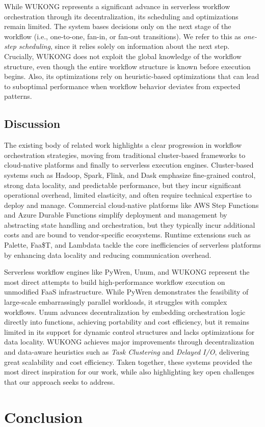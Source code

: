 \documentclass[conference]{IEEEtran}
\begin{document}
While WUKONG represents a significant advance in serverless workflow orchestration through its decentralization, its scheduling and optimizations remain limited. The system bases decisions only on the next stage of the workflow (i.e., one-to-one, fan-in, or fan-out transitions). We refer to this as \textit{one-step scheduling}, since it relies solely on information about the next step. Crucially, WUKONG does not exploit the global knowledge of the workflow structure, even though the entire workflow structure is known before execution begins. Also, its optimizations rely on heuristic-based optimizations that can lead to suboptimal performance when workflow behavior deviates from expected patterns.

\subsection{Discussion}
The existing body of related work highlights a clear progression in workflow orchestration strategies, moving from traditional cluster-based frameworks to cloud-native platforms and finally to serverless execution engines. Cluster-based systems such as Hadoop, Spark, Flink, and Dask emphasize fine-grained control, strong data locality, and predictable performance, but they incur significant operational overhead, limited elasticity, and often require technical expertise to deploy and manage. Commercial cloud-native platforms like AWS Step Functions and Azure Durable Functions simplify deployment and management by abstracting state handling and orchestration, but they typically incur additional costs and are bound to vendor-specific ecosystems. Runtime extensions such as Palette, Faa\$T, and Lambdata tackle the core inefficiencies of serverless platforms by enhancing data locality and reducing communication overhead.

Serverless workflow engines like PyWren, Unum, and WUKONG represent the most direct attempts to build high-performance workflow execution on unmodified FaaS infrastructure. While PyWren demonstrates the feasibility of large-scale embarrassingly parallel workloads, it struggles with complex workflows. Unum advances decentralization by embedding orchestration logic directly into functions, achieving portability and cost efficiency, but it remains limited in its support for dynamic control structures and lacks optimizations for data locality. WUKONG achieves major improvements through decentralization and data-aware heuristics such as \textit{Task Clustering} and \textit{Delayed I/O}, delivering great scalability and cost efficiency. Taken together, these systems provided the most direct inspiration for our work, while also highlighting key open challenges that our approach seeks to address.


\section{Conclusion}



\end{document}
